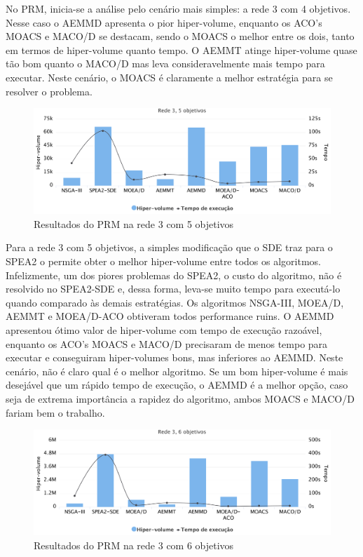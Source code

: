 No PRM, inicia-se a análise pelo cenário mais simples: a rede 3 com 4 objetivos. Nesse caso o AEMMD apresenta o pior hiper-volume, enquanto os ACO's MOACS e MACO/D se destacam, sendo o MOACS o melhor entre os dois, tanto em termos de hiper-volume quanto tempo. O AEMMT atinge hiper-volume quase tão bom quanto o MACO/D mas leva consideravelmente mais tempo para executar. Neste cenário, o MOACS é claramente a melhor estratégia para se resolver o problema.

\begin{figure}[!htbp]
	\caption{Resultados do PRM na rede 3 com 5 objetivos}
	\label{fig_exp4_r3o5}
	\includegraphics[width=1\textwidth]{cap_experimentos/figs/etapa4/r3o5}
\end{figure}

Para a rede 3 com 5 objetivos, a simples modificação que o SDE traz para o SPEA2 o permite obter o melhor hiper-volume entre todos os algoritmos. Infelizmente, um dos piores problemas do SPEA2, o custo do algoritmo, não é resolvido no SPEA2-SDE e, dessa forma, leva-se muito tempo para executá-lo quando comparado às demais estratégias. Os algoritmos NSGA-III, MOEA/D, AEMMT e MOEA/D-ACO obtiveram todos performance ruins. O AEMMD apresentou ótimo valor de hiper-volume com tempo de execução razoável, enquanto os ACO's MOACS e MACO/D precisaram de menos tempo para executar e conseguiram hiper-volumes bons, mas inferiores ao AEMMD. Neste cenário, não é claro qual é o melhor algoritmo. Se um bom hiper-volume é mais desejável que um rápido tempo de execução, o AEMMD é a melhor opção, caso seja de extrema importância a rapidez do algoritmo, ambos MOACS e MACO/D fariam bem o trabalho.

\begin{figure}[!htbp]
	\caption{Resultados do PRM na rede 3 com 6 objetivos}
	\label{fig_exp4_r3o6}
	\includegraphics[width=1\textwidth]{cap_experimentos/figs/etapa4/r3o6}
\end{figure}

